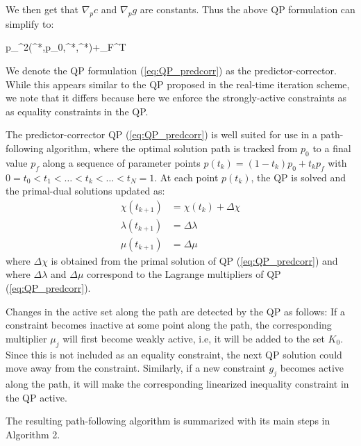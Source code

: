 \documentclass{article}
\theoremstyle{example}
\theoremstyle{definition}
\theoremstyle{assumption}
\theoremstyle{lemma}
\begin{document}
	We then get that $\nabla_pc$ and $\nabla_pg$ are constants.
	Thus the above QP formulation can simplify to:
		\begin{mini!}
		{\Delta\chi\Delta p}{\Delta_{\chi\chi}^2\Lagrange(\chi^*,p_0,\lambda^*,\mu^*)\Delta\chi+\nabla_\chi F^T\Delta\chi}{}{}
		\label{eq:QP_predcorr}
	\end{mini!}
	\par
	We denote the QP formulation (\ref{eq:QP_predcorr}) as the predictor-corrector.
	While this appears similar to the QP proposed in the real-time iteration scheme, we note that it differs because here we enforce the strongly-active constraints as as equality constraints in the QP.
	\par
	The predictor-corrector QP (\ref{eq:QP_predcorr}) is well suited for use in a path-following algorithm, where the optimal solution path is tracked from $p_0$ to a final value $p_f$ along a sequence of parameter points $p(t_k)=(1-t_k)p_0+t_kp_f$ with $0=t_0<t_1<\ldots<t_k<\ldots<t_N=1$.
	At each point $p(t_k)$, the QP is solved and the primal-dual solutions updated as:
	\begin{align}
		\chi(t_{k+1})&=\chi(t_k)+\Delta\chi\\
		\lambda(t_{k+1})&=\Delta\lambda\\
		\mu(t_{k+1})&=\Delta\mu
	\end{align}
where $\Delta\chi$ is obtained from the primal solution of QP (\ref{eq:QP_predcorr}) and where $\Delta\lambda$ and $\Delta\mu$ correspond to the Lagrange multipliers of QP (\ref{eq:QP_predcorr}).
	\par
	Changes in the active set along the path are detected by the QP as follows: If a constraint becomes inactive at some point along the path, the corresponding multiplier $\mu_j$ will first become weakly active, i.e, it will be added to the set $K_0$.
	Since this is not included as an equality constraint, the next QP solution could move away from the constraint.
	Similarly, if a new constraint $g_j$ becomes active along the path, it will make the corresponding linearized inequality constraint in the QP active.
	\par
	The resulting path-following algorithm is summarized with its main steps in Algorithm 2.
\end{document}
